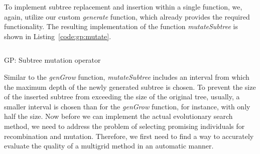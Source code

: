To implement subtree replacement and insertion within a single function, we, again, utilize our custom \emph{generate} function, which already provides the required functionality.
The resulting implementation of the function \emph{mutateSubtree} is shown in Listing~\ref{code:gp:mutate}.
\begin{listing}[!htb]
	\inputminted{python}{evostencils/gp/mutate.py}
	\caption{GP: Subtree mutation operator}
	\label{code:gp:mutate}
\end{listing}
Similar to the \emph{genGrow} function, \emph{mutateSubtree} includes an interval from which the maximum depth of the newly generated subtree is chosen.
To prevent the size of the inserted subtree from exceeding the size of the original tree, usually, a smaller interval is chosen than for the \emph{genGrow} function, for instance, with only half the size.
Now before we can implement the actual evolutionary search method, we need to address the problem of selecting promising individuals for recombination and mutation.
Therefore, we first need to find a way to accurately evaluate the quality of a multigrid method in an automatic manner.

